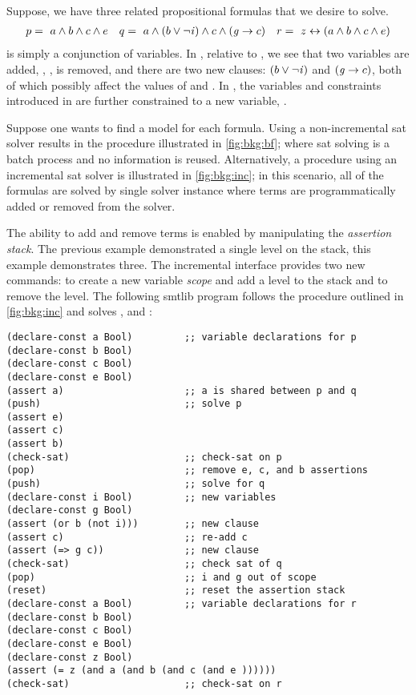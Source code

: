~\label{section:background-incremental}
%
%

%
%
Suppose, we have three related propositional formulas that we desire to solve.
%
\begin{align*}
  p =\ a \wedge b \wedge c \wedge e && q=\ a \wedge (b \vee \neg \mathit{i}{}) \wedge c \wedge (\mathit{g}{} \rightarrow c) && r =~z \leftrightarrow (a \wedge b \wedge c \wedge e)
\end{align*}
%
\pV{} is simply a conjunction of variables. In \qV{}, relative to \pV{}, we see
that two variables are added, \iV{}, \gV{}, \eV{} is removed, and there are two
new clauses: $(b \vee \neg \mathit{i}{})$ and $(\mathit{g}{} \rightarrow c)$, both of which
possibly affect the values of \bV{} and \cV{}. In \rV{}, the variables and
constraints introduced in \pV{} are further constrained to a new variable,
\zV{}.

Suppose one wants to find a model for each formula. Using a non-incremental
\ac{sat} solver results in the procedure illustrated in \autoref{fig:bkg:bf};
where \ac{sat} solving is a batch process and no information is reused.
Alternatively, a procedure using an incremental \ac{sat} solver is illustrated
in \autoref{fig:bkg:inc}; in this scenario, all of the formulas are solved by
single solver instance where terms are programmatically added or removed from
the solver.

The ability to add and remove terms is enabled by manipulating the
\textit{assertion stack}. The previous example demonstrated a single level on
the stack, this example demonstrates three. The incremental interface provides
two new commands:  to create a new variable \emph{scope} and add a
level to the stack and  to remove the level. The following \acl{smtlib}
program follows the procedure outlined in \autoref{fig:bkg:inc} and solves \pV,
\qV{} and \rV{}:

\begin{lstlisting}[columns=flexible,keepspaces=true,language=SMTLIB]
(declare-const a Bool)         ;; variable declarations for p
(declare-const b Bool)
(declare-const c Bool)
(declare-const e Bool)
(assert a)                     ;; a is shared between p and q
(push)                         ;; solve p
(assert e)
(assert c)
(assert b)
(check-sat)                    ;; check-sat on p
(pop)                          ;; remove e, c, and b assertions
(push)                         ;; solve for q
(declare-const i Bool)         ;; new variables
(declare-const g Bool)
(assert (or b (not i)))        ;; new clause
(assert c)                     ;; re-add c
(assert (=> g c))              ;; new clause
(check-sat)                    ;; check sat of q
(pop)                          ;; i and g out of scope
(reset)                        ;; reset the assertion stack
(declare-const a Bool)         ;; variable declarations for r
(declare-const b Bool)
(declare-const c Bool)
(declare-const e Bool)
(declare-const z Bool)
(assert (= z (and a (and b (and c (and e ))))))
(check-sat)                    ;; check-sat on r
\end{lstlisting}

